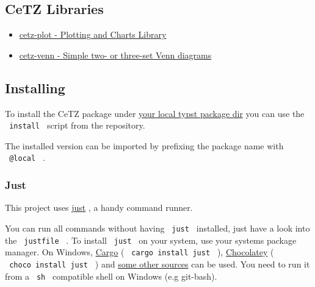 \subsection{CeTZ Libraries}\label{cetz-libraries}

\begin{itemize}
\tightlist
\item
  \href{https://github.com/cetz-package/cetz-plot}{cetz-plot - Plotting
  and Charts Library}
\item
  \href{https://github.com/cetz-package/cetz-venn}{cetz-venn - Simple
  two- or three-set Venn diagrams}
\end{itemize}

\subsection{Installing}\label{installing}

To install the CeTZ package under
\href{https://github.com/typst/packages?tab=readme-ov-file\#local-packages}{your
local typst package dir} you can use the \texttt{\ install\ } script
from the repository.

\begin{Shaded}
\begin{Highlighting}[]
\end{Highlighting}
\end{Shaded}

The installed version can be imported by prefixing the package name with
\texttt{\ @local\ } .

\begin{Shaded}
\begin{Highlighting}[]

\NormalTok{\})}
\end{Highlighting}
\end{Shaded}

\subsubsection{Just}\label{just}

This project uses \href{https://github.com/casey/just}{just} , a handy
command runner.

You can run all commands without having \texttt{\ just\ } installed,
just have a look into the \texttt{\ justfile\ } . To install
\texttt{\ just\ } on your system, use your systems package manager. On
Windows, \href{https://doc.rust-lang.org/cargo/}{Cargo} (
\texttt{\ cargo\ install\ just\ } ),
\href{https://chocolatey.org/}{Chocolatey} (
\texttt{\ choco\ install\ just\ } ) and
\href{https://just.systems/man/en/chapter_4.html}{some other sources}
can be used. You need to run it from a \texttt{\ sh\ } compatible shell
on Windows (e.g git-bash).

